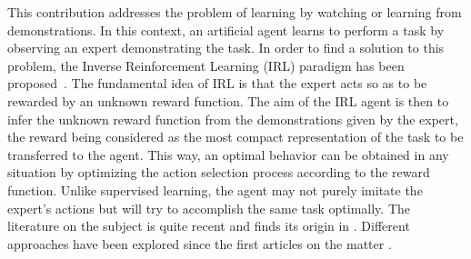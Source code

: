 \documentclass{article}
\begin{document}
This contribution addresses the problem of learning by watching or
learning from demonstrations. In this context, an artificial agent
learns to perform a task by observing an expert demonstrating the
task. In order to find a solution to this problem, the Inverse
Reinforcement Learning (IRL) paradigm has been
proposed~\cite{russell1998learning}. The fundamental idea of IRL is
that the expert acts so as to be rewarded by an unknown reward
function. The aim of the IRL agent is then to infer the unknown
reward function from the demonstrations given by the expert, the
reward being considered as the most compact representation of the
task to be transferred to the agent. This way, an optimal behavior
can be obtained in any situation by optimizing the action selection
process according to the reward function. Unlike supervised
learning, the agent may not purely imitate the expert's actions but
will try to accomplish the same task optimally.
%
%
%
%
The literature on the subject is quite recent and finds its origin
in \cite{russell1998learning}. Different approaches have been
explored since the first articles on the matter
\cite{ng2000algorithms,abbeel2004apprenticeship}.
\end{document}
